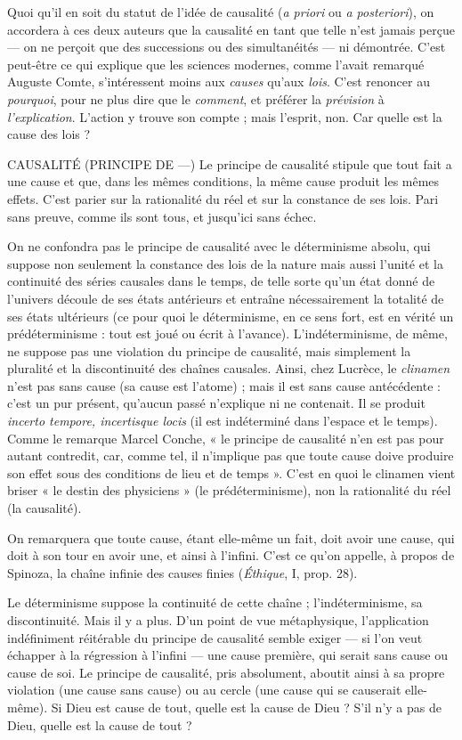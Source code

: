 Quoi qu'il en soit du statut de l’idée de causalité ({\it a priori} ou {\it a posteriori}),
on accordera à ces deux auteurs que la causalité en tant que telle n’est jamais
perçue — on ne perçoit que des successions ou des simultanéités — ni démontrée.
C’est peut-être ce qui explique que les sciences modernes, comme l'avait
remarqué Auguste Comte, s'intéressent moins aux {\it causes} qu'aux {\it lois}. C’est
renoncer au {\it pourquoi}, pour ne plus dire que le {\it comment}, et préférer la {\it prévision}
à {\it l'explication}. L'action y trouve son compte ; mais l'esprit, non. Car quelle est
la cause des lois ?

CAUSALITÉ (PRINCIPE DE —) Le principe de causalité stipule que tout
fait a une cause et que, dans les mêmes
conditions, la même cause produit les mêmes effets. C’est parier sur la rationalité
du réel et sur la constance de ses lois. Pari sans preuve, comme ils sont tous,
et jusqu'ici sans échec.

On ne confondra pas le principe de causalité avec le déterminisme absolu,
qui suppose non seulement la constance des lois de la nature mais aussi l’unité
et la continuité des séries causales dans le temps, de telle sorte qu’un état donné
de l'univers découle de ses états antérieurs et entraîne nécessairement la totalité
de ses états ultérieurs (ce pour quoi le déterminisme, en ce sens fort, est en
vérité un prédéterminisme : tout est joué ou écrit à l'avance). L’indéterminisme,
de même, ne suppose pas une violation du principe de causalité, mais
simplement la pluralité et la discontinuité des chaînes causales. Ainsi, chez
Lucrèce, le {\it clinamen} n’est pas sans cause (sa cause est l’atome) ; mais il est sans
cause antécédente : c’est un pur présent, qu'aucun passé n’explique ni ne contenait.
Il se produit {\it incerto tempore, incertisque locis} (il est indéterminé dans
l’espace et le temps). Comme le remarque Marcel Conche, « le principe de causalité
n’en est pas pour autant contredit, car, comme tel, il n’implique pas que
toute cause doive produire son effet sous des conditions de lieu et de temps ».
C’est en quoi le clinamen vient briser « le destin des physiciens » (le prédéterminisme),
non la rationalité du réel (la causalité).

On remarquera que toute cause, étant elle-même un fait, doit avoir une
cause, qui doit à son tour en avoir une, et ainsi à l’infini. C’est ce qu’on appelle,
à propos de Spinoza, la chaîne infinie des causes finies ({\it Éthique}, I, prop. 28).

Le déterminisme suppose la continuité de cette chaîne ; l’indéterminisme, sa
discontinuité. Mais il y a plus. D’un point de vue métaphysique, l’application
indéfiniment réitérable du principe de causalité semble exiger — si l’on veut
échapper à la régression à l’infini — une cause première, qui serait sans cause ou
cause de soi. Le principe de causalité, pris absolument, aboutit ainsi à sa propre
violation (une cause sans cause) ou au cercle (une cause qui se causerait elle-même).
Si Dieu est cause de tout, quelle est la cause de Dieu ? S’il n’y a pas de
Dieu, quelle est la cause de tout ?


